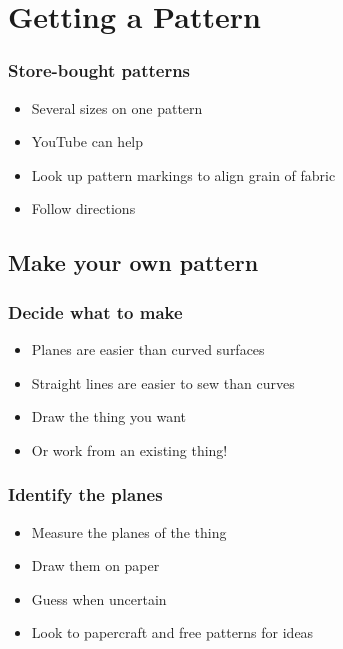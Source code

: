 \documentclass{beamer}
\begin{document}
\section{Getting a Pattern}

\begin{frame}[fragile]
\tableofcontents[currentsection]
\end{frame}


\begin{frame}[fragile]
\frametitle{Store-bought patterns}
\begin{itemize}
\item Several sizes on one pattern
\item YouTube can help
\item Look up pattern markings to align grain of fabric
\item Follow directions
\end{itemize}
\end{frame}

\subsection{Make your own pattern}

\begin{frame}[fragile]
\tableofcontents[currentsubsection]
\end{frame}


\begin{frame}[fragile]
\frametitle{Decide what to make}
\begin{itemize}
\item Planes are easier than curved surfaces
\item Straight lines are easier to sew than curves
\item Draw the thing you want
\item Or work from an existing thing!
\end{itemize}
\end{frame}

\begin{frame}[fragile]
\frametitle{Identify the planes}
\begin{itemize}
\item Measure the planes of the thing
\item Draw them on paper
\item Guess when uncertain
\item Look to papercraft and free patterns for ideas
\end{itemize}
\end{frame}
\end{document}
